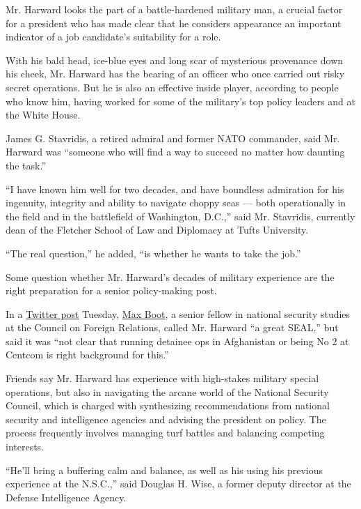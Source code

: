 Mr. Harward looks the part of a battle-hardened military man, a crucial
factor for a president who has made clear that he considers appearance
an important indicator of a job candidate's suitability for a role.

With his bald head, ice-blue eyes and long scar of mysterious provenance
down his cheek, Mr. Harward has the bearing of an officer who once
carried out risky secret operations. But he is also an effective inside
player, according to people who know him, having worked for some of the
military's top policy leaders and at the White House.

James G. Stavridis, a retired admiral and former NATO commander, said
Mr. Harward was ``someone who will find a way to succeed no matter how
daunting the task.''

``I have known him well for two decades, and have boundless admiration
for his ingenuity, integrity and ability to navigate choppy seas ---
both operationally in the field and in the battlefield of Washington,
D.C.,'' said Mr. Stavridis, currently dean of the Fletcher School of Law
and Diplomacy at Tufts University.

``The real question,'' he added, ``is whether he wants to take the
job.''

Some question whether Mr. Harward's decades of military experience are
the right preparation for a senior policy-making post.

In a
\href{https://twitter.com/MaxBoot/status/831522476140195843}{Twitter
post} Tuesday,
\href{http://www.cfr.org/experts/national-security-warfare-terrorism/max-boot/b5641}{Max
Boot}, a senior fellow in national security studies at the Council on
Foreign Relations, called Mr. Harward ``a great SEAL,'' but said it was
``not clear that running detainee ops in Afghanistan or being No 2 at
Centcom is right background for this.''

Friends say Mr. Harward has experience with high-stakes military special
operations, but also in navigating the arcane world of the National
Security Council, which is charged with synthesizing recommendations
from national security and intelligence agencies and advising the
president on policy. The process frequently involves managing turf
battles and balancing competing interests.

``He'll bring a buffering calm and balance, as well as his using his
previous experience at the N.S.C.,'' said Douglas H. Wise, a former
deputy director at the Defense Intelligence Agency.

